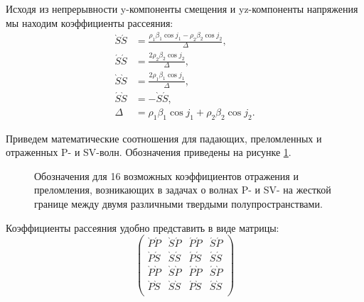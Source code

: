 Исходя из непрерывности y-компоненты смещения и yz-компоненты напряжения мы находим коэффициенты рассеяния:
\begin{align}
\grave{S}\acute{S} &= \frac{\rho_1 \beta_1 \cos{j_1} - \rho_2 \beta_2 \cos{j_2}}{\Delta}, \nonumber\\
\acute{S}\acute{S} &= \frac{2 \rho_2 \beta_2 \cos{j_2}}{\Delta}, \nonumber\\
\grave{S}\grave{S} &= \frac{2 \rho_1 \beta_1 \cos{j_1}}{\Delta}, \nonumber\\
\acute{S}\grave{S} &= - \grave{S}\acute{S}, \nonumber\\
\Delta &= \rho_1 \beta_1 \cos{j_1} + \rho_2 \beta_2 \cos{j_2}.
\end{align}

Приведем математические соотношения для падающих, преломленных и отраженных P- и SV-волн. Обозначения приведены на рисунке \ref{pic:fig32}.

\begin{figure}[h]
\caption{Обозначения для 16 возможных коэффициентов отражения и преломления, возникающих в задачах о волнах P- и SV- на жесткой границе между двумя различными твердыми полупространствами.}
\label{pic:fig32}
\end{figure}

Коэффициенты рассеяния удобно представить в виде матрицы:
\begin{displaymath}
\left( \begin{array}{cccc}
\grave{P}\acute{P} & \grave{S}\acute{P} & \acute{P}\acute{P} & \acute{S}\acute{P} \\
\grave{P}\acute{S} & \grave{S}\acute{S} & \acute{P}\acute{S} & \acute{S}\acute{S} \\
\grave{P}\grave{P} & \grave{S}\grave{P} & \acute{P}\grave{P} & \acute{S}\grave{P} \\
\grave{P}\grave{S} & \grave{S}\grave{S} & \acute{P}\grave{S} & \acute{S}\grave{S} \\
\end{array} \right)
\end{displaymath} 


